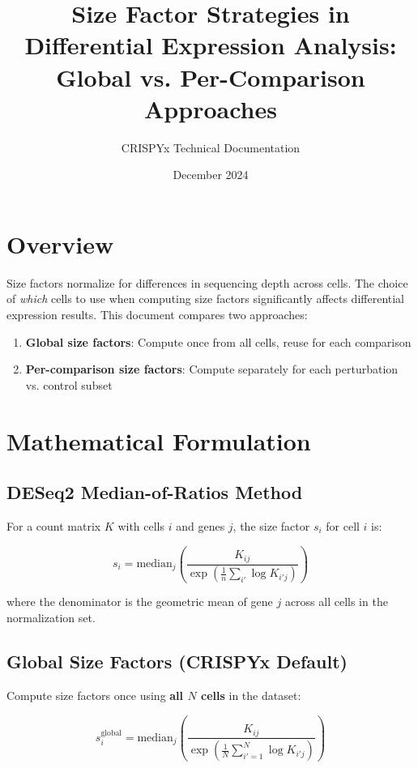 \documentclass[11pt]{article}
\title{Size Factor Strategies in Differential Expression Analysis:\\
Global vs. Per-Comparison Approaches}
\author{CRISPYx Technical Documentation}
\date{December 2024}
\begin{document}
\maketitle

\section{Overview}

Size factors normalize for differences in sequencing depth across cells. The choice of \textit{which} cells to use when computing size factors significantly affects differential expression results. This document compares two approaches:

\begin{enumerate}
    \item \textbf{Global size factors}: Compute once from all cells, reuse for each comparison
    \item \textbf{Per-comparison size factors}: Compute separately for each perturbation vs. control subset
\end{enumerate}

\section{Mathematical Formulation}

\subsection{DESeq2 Median-of-Ratios Method}

For a count matrix $K$ with cells $i$ and genes $j$, the size factor $s_i$ for cell $i$ is:

\begin{equation}
s_i = \text{median}_j \left( \frac{K_{ij}}{\exp\left( \frac{1}{n} \sum_{i'} \log K_{i'j} \right)} \right)
\end{equation}

where the denominator is the geometric mean of gene $j$ across all cells in the normalization set.

\subsection{Global Size Factors (CRISPYx Default)}

Compute size factors once using \textbf{all $N$ cells} in the dataset:

\begin{equation}
s_i^{\text{global}} = \text{median}_j \left( \frac{K_{ij}}{\exp\left( \frac{1}{N} \sum_{i'=1}^{N} \log K_{i'j} \right)} \right)
\end{equation}
\end{document}
